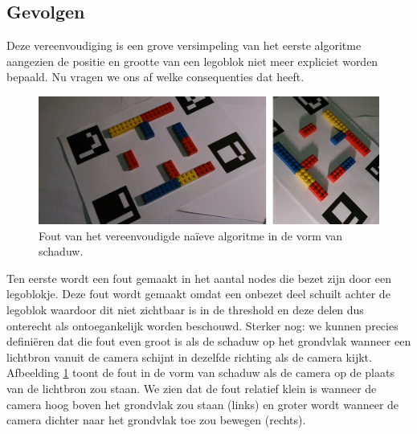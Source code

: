 \subsection{Gevolgen}
Deze vereenvoudiging is een grove versimpeling van het eerste algoritme aangezien de positie en grootte van een legoblok niet meer expliciet worden bepaald. Nu vragen we ons af welke consequenties dat heeft.

\begin{figure}
  \centering
  \includegraphics[width=\linewidth]{img/alg2Shadow}
  \caption{Fout van het vereenvoudigde na\"ieve algoritme in de vorm van schaduw.}
  \label{fig:algo2_shadow}
\end{figure}

Ten eerste wordt een fout gemaakt in het aantal nodes die bezet zijn door een legoblokje. Deze fout wordt gemaakt omdat een onbezet deel schuilt achter de legoblok waardoor dit niet zichtbaar is in de threshold en deze delen dus onterecht als ontoegankelijk worden beschouwd. Sterker nog: we kunnen precies defini\"eren dat die fout even groot is als de schaduw op het grondvlak wanneer een lichtbron vanuit de camera schijnt in dezelfde richting als de camera kijkt. Afbeelding \ref{fig:algo2_shadow} toont de fout in de vorm van schaduw als de camera op de plaats van de lichtbron zou staan. We zien dat de fout relatief klein is wanneer de camera hoog boven het grondvlak zou staan (links) en groter wordt wanneer de camera dichter naar het grondvlak toe zou bewegen (rechts).

